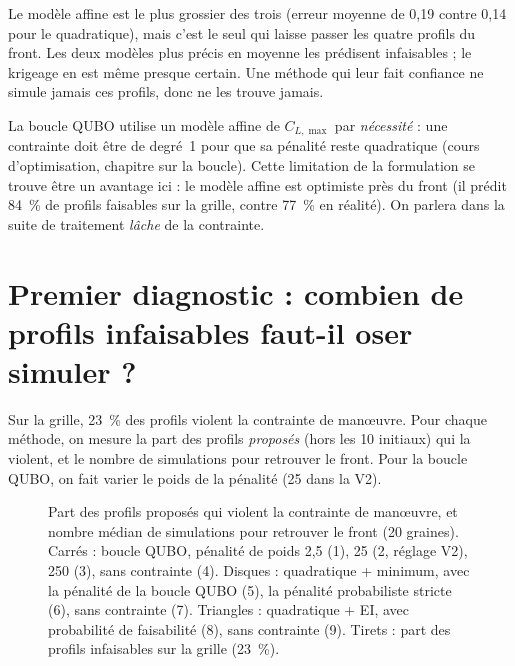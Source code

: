 \begin{resultat}
Le modèle affine est le plus grossier des trois (erreur moyenne de 0,19 contre 0,14 pour le quadratique), mais c'est le seul qui laisse passer les quatre profils du front. Les deux modèles plus précis en moyenne les prédisent infaisables ; le krigeage en est même presque certain. Une méthode qui leur fait confiance ne simule jamais ces profils, donc ne les trouve jamais.
\end{resultat}

\begin{projet}
La boucle QUBO utilise un modèle affine de $C_{L,\max}$ par \emph{nécessité} : une contrainte doit être de degré~1 pour que sa pénalité reste quadratique (cours d'optimisation, chapitre sur la boucle). Cette limitation de la formulation se trouve être un avantage ici : le modèle affine est optimiste près du front (il prédit 84~\% de profils faisables sur la grille, contre 77~\% en réalité). On parlera dans la suite de traitement \emph{lâche} de la contrainte.
\end{projet}

\section{Premier diagnostic : combien de profils infaisables faut-il oser simuler ?}
Sur la grille, 23~\% des profils violent la contrainte de manœuvre. Pour chaque méthode, on mesure la part des profils \emph{proposés} (hors les 10 initiaux) qui la violent, et le nombre de simulations pour retrouver le front. Pour la boucle QUBO, on fait varier le poids de la pénalité (25 dans la V2).

\begin{figure}[htbp]
\centering

\caption{Part des profils proposés qui violent la contrainte de manœuvre, et nombre médian de simulations pour retrouver le front (20 graines). Carrés : boucle QUBO, pénalité de poids 2,5 (1), 25 (2, réglage V2), 250 (3), sans contrainte (4). Disques : quadratique + minimum, avec la pénalité de la boucle QUBO (5), la pénalité probabiliste stricte (6), sans contrainte (7). Triangles : quadratique + EI, avec probabilité de faisabilité (8), sans contrainte (9). Tirets : part des profils infaisables sur la grille (23~\%).}\label{fig:diag-contrainte}
\end{figure}

